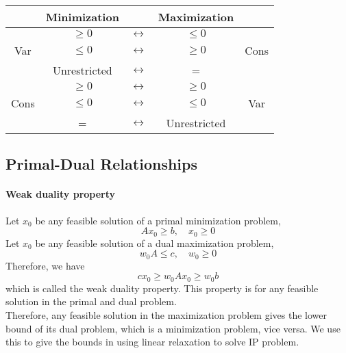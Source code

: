                 \begin{table}[!htp]
                    \centering
                    \begin{tabular}{|c|c|c|c|c|}
                        \hline & Minimization& & Maximization& \\
                        \hline & $\geq 0$ & $\longleftrightarrow$ & $\leq 0$ & \\
                        Var & $\leq 0$ & $\longleftrightarrow$ & $\geq 0$ & Cons \\
                        & Unrestricted & $\longleftrightarrow$ & = & \\
                        \hline & $\geq 0$ & $\longleftrightarrow$ & $\geq 0$ & \\
                        Cons & $\leq 0$ & $\longleftrightarrow$ & $\leq 0$ & Var \\
                        & = & $\longleftrightarrow$ & Unrestricted & \\
                        \hline
                    \end{tabular}
                \end{table}                

            \subsection{Primal-Dual Relationships}
                \paragraph{Weak duality property}
                    Let $x_0$ be any feasible solution of a primal minimization problem,
                    \begin{equation}
                        Ax_0 \ge b, \quad x_0\ge 0 \nonumber
                    \end{equation}
                    Let $x_0$ be any feasible solution of a dual maximization problem,
                    \begin{equation}
                        w_0A \le c, \quad w_0\ge 0 \nonumber
                    \end{equation}
                    Therefore, we have
                    \begin{equation}
                        cx_0 \ge w_0Ax_0 \ge w_0b \nonumber
                    \end{equation}
                    which is called the weak duality property. This property is for any feasible solution in the primal and dual problem.\\
                    Therefore, any feasible solution in the maximization problem gives the lower bound of its dual problem, which is a minimization problem, vice versa. We use this to give the bounds in using linear relaxation to solve IP problem.

